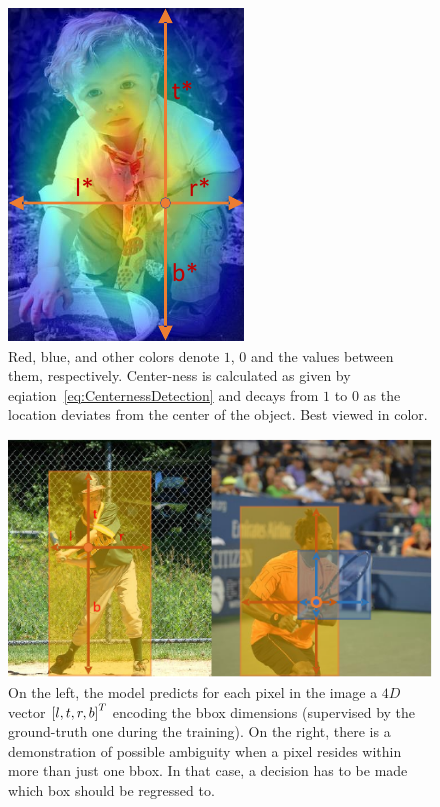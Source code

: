 \begin{figure}[t]
    \centerline{\includegraphics[width=0.25\linewidth]{figures/theoretical_foundations/fcos_centerness.pdf}}
    \caption[Centerness visualization]{Red, blue, and other colors denote $1$, $0$ and the values between them, respectively. Center-ness is calculated as given by eqiation~\ref{eq:CenternessDetection} and decays from $1$ to $0$ as the location deviates from the center of the object. Best viewed in color. }
    \label{fig:FCOSCenterness}
\end{figure}

\begin{figure}[t]
    \centerline{\includegraphics[width=0.6\linewidth]{figures/theoretical_foundations/fcos_detection_demo.pdf}}
    \caption[\Gls{fcos} predictions]{On the left, the model predicts for each pixel in the image a $4D$ vector $\left[ {l, t, r, b} \right]^T$ encoding the \gls{bbox} dimensions (supervised by the ground-truth one during the training). On the right, there is a demonstration of possible ambiguity when a pixel resides within more than just one \gls{bbox}. In that case, a decision has to be made which box should be regressed to. }
    \label{fig:FCOSDetectionDemo}
\end{figure}
